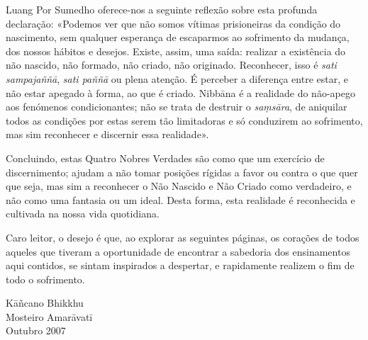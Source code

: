 Luang Por Sumedho oferece-nos a seguinte reflexão sobre esta profunda
declaração: «Podemos ver que não somos vítimas prisioneiras da condição do
nascimento, sem qualquer esperança de escaparmos ao sofrimento da mudança, dos
nossos hábitos e desejos. Existe, assim, uma saída: realizar a existência do não
nascido, não formado, não criado, não originado. Reconhecer, isso é \emph{sati
  sampajaññā}, \emph{sati paññā} ou plena atenção. É perceber a diferença entre
estar, e não estar apegado à forma, ao que é criado. Nibbāna é a realidade do
não-apego aos fenómenos condicionantes; não se trata de destruir o
\emph{saṃsāra}, de aniquilar todos as condições por estas serem tão limitadoras
e só conduzirem ao sofrimento, mas sim reconhecer e discernir essa realidade».

Concluindo, estas Quatro Nobres Verdades são como que um exercício de
discernimento; ajudam a não tomar posições rígidas a favor ou contra o que quer
que seja, mas sim a reconhecer o Não Nascido e Não Criado como verdadeiro, e não
como uma fantasia ou um ideal. Desta forma, esta realidade é reconhecida e
cultivada na nossa vida quotidiana.

\bigskip

Caro leitor, o desejo é que, ao explorar as seguintes páginas, os corações de todos aqueles que tiveram a oportunidade
de encontrar a sabedoria dos ensinamentos aqui contidos, se
sintam inspirados a despertar, e rapidamente realizem o fim
de todo o sofrimento.

\bigskip

{\raggedleft
  Kāñcano Bhikkhu\\
  Mosteiro Amarāvatī\\
  Outubro 2007
\par}

